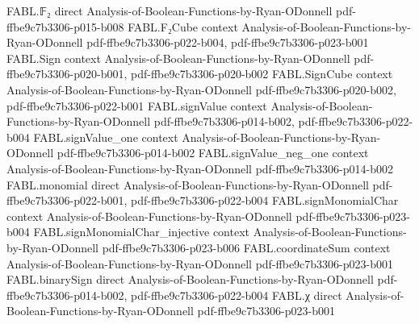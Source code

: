 \begin{theorem}
\label{FABL.one_div_le_local_composed_rejection}
\leanok
{}
\proofstep
  {FABL.𝔽₂}
  {direct}
  {Analysis-of-Boolean-Functions-by-Ryan-ODonnell}
  {pdf-ffbe9c7b3306-p015-b008}
\proofstep
  {FABL.F₂Cube}
  {context}
  {Analysis-of-Boolean-Functions-by-Ryan-ODonnell}
  {pdf-ffbe9c7b3306-p022-b004,
    pdf-ffbe9c7b3306-p023-b001}
\proofstep
  {FABL.Sign}
  {context}
  {Analysis-of-Boolean-Functions-by-Ryan-ODonnell}
  {pdf-ffbe9c7b3306-p020-b001,
    pdf-ffbe9c7b3306-p020-b002}
\proofstep
  {FABL.SignCube}
  {context}
  {Analysis-of-Boolean-Functions-by-Ryan-ODonnell}
  {pdf-ffbe9c7b3306-p020-b002,
    pdf-ffbe9c7b3306-p022-b001}
\proofstep
  {FABL.signValue}
  {context}
  {Analysis-of-Boolean-Functions-by-Ryan-ODonnell}
  {pdf-ffbe9c7b3306-p014-b002,
    pdf-ffbe9c7b3306-p022-b004}
\proofstep
  {FABL.signValue_one}
  {context}
  {Analysis-of-Boolean-Functions-by-Ryan-ODonnell}
  {pdf-ffbe9c7b3306-p014-b002}
\proofstep
  {FABL.signValue_neg_one}
  {context}
  {Analysis-of-Boolean-Functions-by-Ryan-ODonnell}
  {pdf-ffbe9c7b3306-p014-b002}
\proofstep
  {FABL.monomial}
  {direct}
  {Analysis-of-Boolean-Functions-by-Ryan-ODonnell}
  {pdf-ffbe9c7b3306-p022-b001,
    pdf-ffbe9c7b3306-p022-b004}
\proofstep
  {FABL.signMonomialChar}
  {context}
  {Analysis-of-Boolean-Functions-by-Ryan-ODonnell}
  {pdf-ffbe9c7b3306-p023-b004}
\proofstep
  {FABL.signMonomialChar_injective}
  {context}
  {Analysis-of-Boolean-Functions-by-Ryan-ODonnell}
  {pdf-ffbe9c7b3306-p023-b006}
\proofstep
  {FABL.coordinateSum}
  {context}
  {Analysis-of-Boolean-Functions-by-Ryan-ODonnell}
  {pdf-ffbe9c7b3306-p023-b001}
\proofstep
  {FABL.binarySign}
  {direct}
  {Analysis-of-Boolean-Functions-by-Ryan-ODonnell}
  {pdf-ffbe9c7b3306-p014-b002,
    pdf-ffbe9c7b3306-p022-b004}
\proofstep
  {FABL.χ}
  {direct}
  {Analysis-of-Boolean-Functions-by-Ryan-ODonnell}
  {pdf-ffbe9c7b3306-p023-b001}

\end{theorem}

